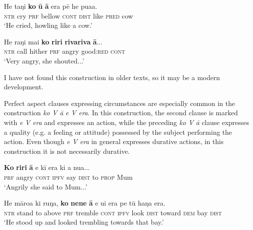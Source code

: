 \ea\label{ex:11.274}
\gll He taŋi \textbf{ko} \textbf{{\ꞌ}ū} \textbf{{\ꞌ}ā} era pē he pua{\ꞌ}a. \\
\textsc{ntr} cry \textsc{prf} bellow \textsc{cont} \textsc{dist} like \textsc{pred} cow \\

\glt 
‘He cried, howling like a cow.’ \textstyleExampleref{[R210.016]} 
\z

\ea\label{ex:11.275}
\gll He raŋi mai \textbf{ko} \textbf{riri} \textbf{rivariva} \textbf{{\ꞌ}ā}... \\
\textsc{ntr} call hither \textsc{prf} angry good:\textsc{red} \textsc{cont} \\

\glt
‘Very angry, she shouted...’ \textstyleExampleref{[R245.214]} 
\z

I have not found this construction in older texts, so it may be a modern development.

Perfect aspect clauses expressing circumstances are especially common in the construction \textit{ko V {\ꞌ}ā} \textit{e V era}. In this construction, the second clause is marked with \textit{e V era} and expresses an action, while the preceding \textit{ko V {\ꞌ}ā} clause expresses a quality (e.g. a feeling or attitude) possessed by the subject performing the action. Even though \textit{e V era} in general expresses durative actions, in this construction it is not necessarily durative. 

\ea\label{ex:11.276}
\gll \textbf{Ko} \textbf{riri} \textbf{{\ꞌ}ā} e kī era ki a nua... \\
\textsc{prf} angry \textsc{cont} \textsc{ipfv} say \textsc{dist} to \textsc{prop} Mum \\

\glt 
‘Angrily she said to Mum...’ \textstyleExampleref{[R210.062]} 
\z

\ea\label{ex:11.277}
\gll He māroa ki ruŋa, \textbf{ko} \textbf{nene} \textbf{{\ꞌ}ā} e u{\ꞌ}i era pe tū haŋa era. \\
\textsc{ntr} stand to above \textsc{prf} tremble \textsc{cont} \textsc{ipfv} look \textsc{dist} toward \textsc{dem} bay \textsc{dist} \\

\glt
‘He stood up and looked trembling towards that bay.’ \textstyleExampleref{[R408.128]} 
\z

